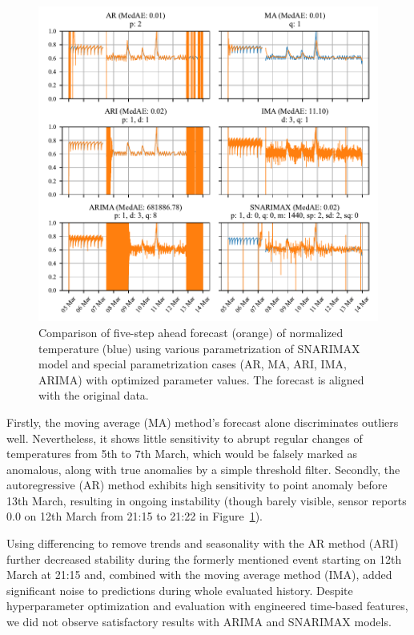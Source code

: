 \documentclass{article}
\begin{document}
\begin{enumerate}
        \begin{figure}[htbp]
            \centerline{\includegraphics[width=\textwidth]{ARIMA_opt_results.pdf}}
            \caption{Comparison of five-step ahead forecast (orange) of normalized temperature (blue) using various parametrization of SNARIMAX model and special parametrization cases (AR, MA, ARI, IMA, ARIMA) with optimized parameter values. The forecast is aligned with the original data.}
            \label{fig:snarimax}
      \end{figure}

       Firstly, the moving average (MA) method's forecast alone discriminates outliers well. Nevertheless, it shows little sensitivity to abrupt regular changes of temperatures from 5th to 7th March, which would be falsely marked as anomalous, along with true anomalies by a simple threshold filter. Secondly, the autoregressive (AR) method exhibits high sensitivity to point anomaly before 13th March, resulting in ongoing instability (though barely visible, sensor reports 0.0 on 12th March from 21:15 to 21:22 in Figure~\ref{fig:snarimax}).
       
       Using differencing to remove trends and seasonality with the AR method (ARI) further decreased stability during the formerly mentioned event starting on 12th March at 21:15 and, combined with the moving average method (IMA), added significant noise to predictions during whole evaluated history. Despite hyperparameter optimization and evaluation with engineered time-based features, we did not observe satisfactory results with ARIMA and SNARIMAX models. 
        

\end{enumerate}
\end{document}
